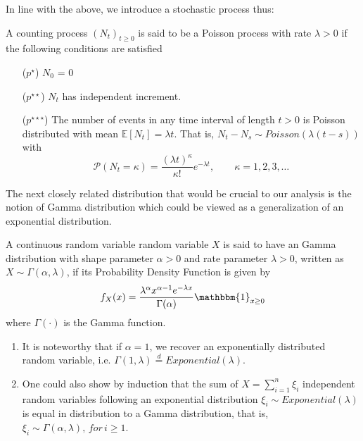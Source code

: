 In line with the above, we introduce a stochastic process thus:
\begin{definition}\label{POisson_1}
A counting process $(N_t)_{t \geq 0}$ is said to be a Poisson process with rate  $\lambda > 0$ if the following conditions are satisfied
\begin{enumerate}[label=(\roman*)]
     \item[($p^{\star}$)] $N_0$ = 0
     \item[($p^{\star \star}$)] $N_t$ has independent increment.
     \item[($p^{\star \star \star}$)] The number of events in any time interval of length $t > 0$ is Poisson distributed with mean $\mathbb{E}[N_t] = \lambda t$. That is, $N_t - N_s \sim Poisson(\lambda (t-s))$ with 
     \begin{equation} 
         \mathcal{P} (N_t = \kappa) = \dfrac{(\lambda t)^\kappa}{\kappa !}e^{-\lambda t}, \qquad \kappa = 1, 2, 3, \ldots 
     \end{equation}
\end{enumerate}
\end{definition}
The next closely related distribution that would be crucial to our analysis is the notion of Gamma distribution which could be viewed as a generalization of an exponential distribution.
\begin{definition}
A continuous random variable random variable $X$ is said to have an Gamma distribution with shape parameter $\alpha > 0$ and rate parameter $\lambda > 0$, written as $X \sim \Gamma(\alpha, \lambda)$, if its Probability Density Function is given by  
\begin{equation}
    f_X(x) = \dfrac{\lambda^{\alpha} x^{\alpha-1} e^{-\lambda x}}{\Gamma (\alpha)}\mathbbm{1}_{x\geq 0}
\end{equation}
where $\Gamma (\cdot)$ is the Gamma function.
\end{definition}
\begin{remark}\label{remark_Gamma}
\begin{enumerate}[label=(\roman*)]
        \item It is noteworthy that if $\alpha = 1$, we recover an exponentially distributed random variable, i.e. $ \Gamma(1, \lambda) \overset{d}{=}  Exponential(\lambda)$.
        \item One could also show by induction that the sum of $X = \sum_{i=1}^n \xi_i $ independent random variables following an exponential distribution $\xi_i \sim Exponential(\lambda)$ is equal in distribution to a Gamma distribution, that is, $\xi_i \sim \Gamma(\alpha,\lambda), \, for \, i \geq 1$.
   \end{enumerate}
\end{remark}
